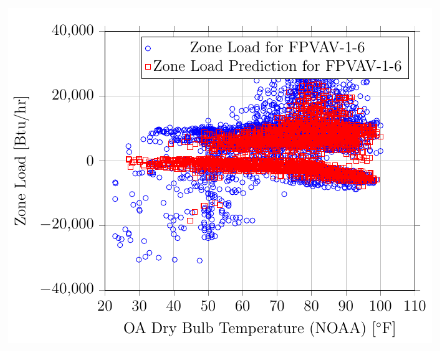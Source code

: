 \begin{figure}
\centering
\includegraphics{Plots/31/2017-06-27-1400-BtuhrvsOADryBulbTemperatureNOAAF.pdf}
\caption{}
\label{fig:2017-06-27-1401-BtuhrvsOADryBulbTemperatureNOAAF}
\end{figure}




\pagebreak{}
